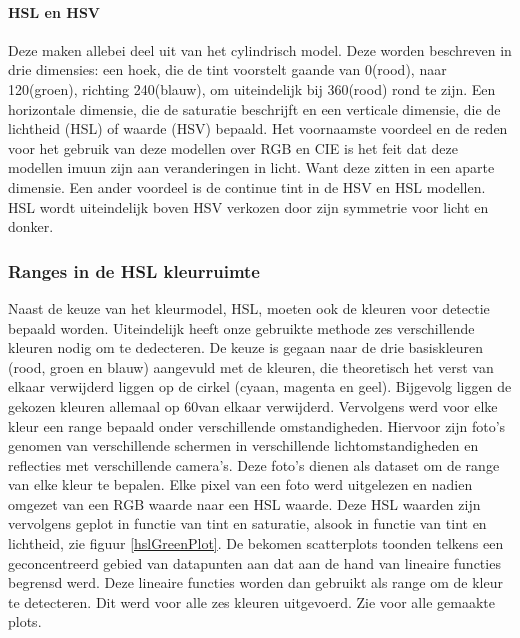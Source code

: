 \paragraph{HSL en HSV} Deze maken allebei deel uit van het cylindrisch model. Deze worden beschreven in drie dimensies: een hoek, die de tint voorstelt gaande van 0\degree (rood), naar 120\degree (groen), richting 240\degree (blauw), om uiteindelijk bij 360\degree (rood) rond te zijn. Een horizontale dimensie, die de saturatie beschrijft en een verticale dimensie, die de lichtheid (HSL) of waarde (HSV) bepaald. Het voornaamste voordeel en de reden voor het gebruik van deze modellen over RGB en CIE is het feit dat deze modellen imuun zijn aan veranderingen in licht. Want deze zitten in een aparte dimensie. Een ander voordeel is de continue tint in de HSV en HSL modellen. HSL wordt uiteindelijk boven HSV verkozen door zijn symmetrie voor licht en donker. \cite{inbook} \cite{rasouli2017effect}

\subsubsection{Ranges in de HSL kleurruimte} \label{Ranges}
Naast de keuze van het kleurmodel, HSL, moeten ook de kleuren voor detectie bepaald worden. Uiteindelijk heeft onze gebruikte methode zes verschillende kleuren nodig om te dedecteren. De keuze is gegaan naar de drie basiskleuren (rood, groen en blauw) aangevuld met de kleuren, die theoretisch het verst van elkaar verwijderd liggen op de cirkel (cyaan, magenta en geel). Bijgevolg liggen de gekozen kleuren allemaal op 60\degree van elkaar verwijderd. Vervolgens werd voor elke kleur een range bepaald onder verschillende omstandigheden. Hiervoor zijn foto's genomen van verschillende schermen in verschillende lichtomstandigheden en reflecties met verschillende camera's. Deze foto's dienen als dataset om de range van elke kleur te bepalen. Elke pixel van een foto werd uitgelezen en nadien omgezet van een RGB waarde naar een HSL waarde. Deze HSL waarden zijn vervolgens geplot in functie van tint en saturatie, alsook in functie van tint en lichtheid, zie figuur \ref{hslGreenPlot}. De bekomen scatterplots toonden telkens een geconcentreerd gebied van datapunten aan dat aan de hand van lineaire functies begrensd werd. Deze lineaire functies worden dan gebruikt als range om de kleur te detecteren. Dit werd voor alle zes kleuren uitgevoerd. Zie \cite{Kleuren plots} voor alle gemaakte plots. \cite{TSAI20121291}

